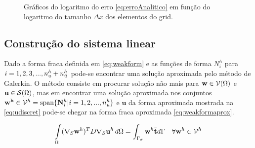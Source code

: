 \begin{figure}[h]
\center
{}
\qquad
{}
\caption{Gráficos do logaritmo do erro \eqref{eq:erroAnalitico} em função do logaritmo do tamanho $\Delta x$ dos elementos do grid.}
\end{figure}
    


\subsection{Construção do sistema linear}

Dado a forma fraca definida em \eqref{eq:weakform} e as funções de forma $N_i^h$ para $i = 1, 2, 3, ..., n_u^h + n_{\bar{u}}^h$ pode-se encontrar uma solução aproximada pelo método de Galerkin. O método consiste em procurar solução não mais para $\mathbf{w} \in \mathcal{V}(\Omega)$ e $\mathbf{u} \in \mathcal{S}(\Omega)$, mas em encontrar uma solução aproximada nos conjuntos  $\mathbf{w^h} \in \mathcal{V}^h = \text{span}\{ \mathbf{N}_{i}^h | i = 1,2, ..., n_u^h  \}$ e $\mathbf{u}$ da forma aproximada mostrada na \eqref{eq:udiscret} pode-se chegar na forma fraca aproximada \eqref{eq:weakformaprox}.


\begin{equation}\label{eq:weakformaprox}
\int\limits_{\Omega}  (\nabla_S \mathbf{w}^h)^T D \nabla_S  \mathbf{u}^h \, d\Omega  =  \int_{\Gamma_\sigma} \mathbf{w}^h \bar{\mathbf{t}} d\Gamma \quad \forall \mathbf{w}^h \in \mathcal{V}^h
\end{equation}


